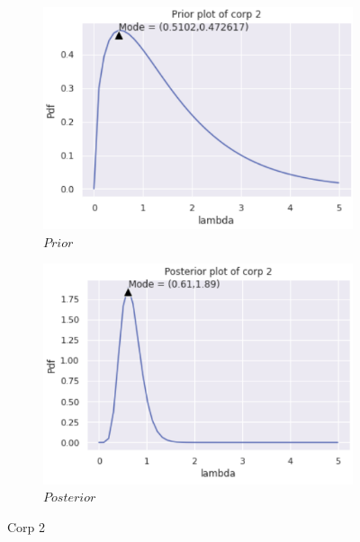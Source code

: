 \documentclass[english,a4paper,12pt]{article}
\begin{document}
\begin{enumerate}
\begin{itemize}
{\begin{figure} [h!]
\begin{subfigure}[b]{0.3\textwidth}
         \includegraphics[width=\textwidth]{pictures/Q3/Prior_C2.png}
         \caption{$Prior$}
         \label{Prior}
     \end{subfigure}
     \hfill
     \begin{subfigure}[b]{0.3\textwidth}
         \centering
         \includegraphics[width=\textwidth]{pictures/Q3/Posterior_C2.png}
         \caption{$Posterior$}
         \label{Posterior}
     \end{subfigure}
        \caption{Corp 2}
        \label{Corp 2 }
\end{figure}}




\end{itemize}
\end{enumerate}
\end{document}
